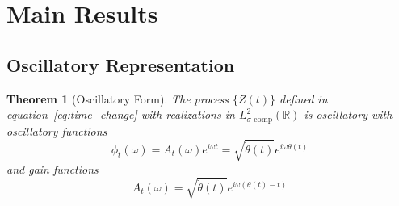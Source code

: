 \documentclass{article}
\newtheorem{theorem}{Theorem}
\begin{document}
\section{Main Results}

\subsection{Oscillatory Representation}

\begin{theorem}
  [Oscillatory Form]\label{thm:osc_rep} The process $\{Z (t)\}$ defined in
  equation~\eqref{eq:time_change} with realizations in $L^2_{\sigma
  \text{-comp}} (\mathbb{R})$ is oscillatory with oscillatory functions
  \begin{equation}
    \label{eq:phi_def} \phi_t (\omega) = A_t (\omega) e^{i \omega t} =
    \sqrt{\dot{\theta} (t)} e^{i \omega \theta (t)}
  \end{equation}
  and gain functions
  \begin{equation}
    A_t (\omega) = \sqrt{\dot{\theta} (t)} e^{i \omega (\theta (t) - t)}
  \end{equation}
\end{theorem}
\end{document}
